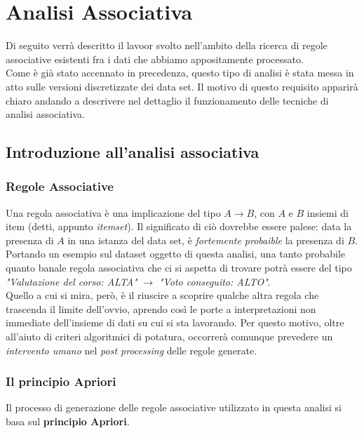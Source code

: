 \chapter{Analisi Associativa}

Di seguito verrà descritto il lavoor svolto nell'ambito della ricerca di regole associative esistenti fra i dati che abbiamo appositamente processato. \\

Come è già stato accennato in precedenza, questo tipo di analisi è stata messa in atto sulle versioni discretizzate dei data set. Il motivo di questo requisito apparirà chiaro andando a descrivere nel dettaglio il funzionamento delle tecniche di analisi associativa.

\section{Introduzione all'analisi associativa}

    \subsection{Regole Associative}

        Una regola associativa è una implicazione del tipo $A \rightarrow B$, con $A$ e $B$ insiemi di item (detti, appunto \textit{itemset}). Il significato di ciò dovrebbe essere palese: data la presenza di $A$ in una istanza del data set, è \textit{fortemente probaible} la presenza di $B$. \\

        Portando un esempio sul dataset oggetto di questa analisi, una tanto probabile quanto banale regola associativa che ci si aspetta di trovare potrà essere del tipo \textit{"Valutazione del corso: ALTA"} $\rightarrow$ \textit{"Voto conseguito: ALTO"}. \\
        
        Quello a cui si mira, però, è il riuscire a scoprire qualche altra regola che trascenda il limite dell'ovvio, aprendo così le porte a interpretazioni non immediate dell'insieme di dati su cui si sta lavorando. Per questo motivo, oltre all'aiuto di criteri algoritmici di potatura, occorrerà comunque prevedere un \textit{intervento umano} nel \textit{post processing} delle regole generate.

    \subsection{Il principio Apriori}

        Il processo di generazione delle regole associative utilizzato in questa analisi si basa sul \textbf{principio Apriori}.
 

